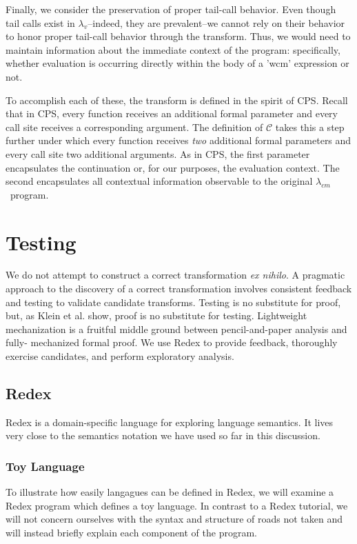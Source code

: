 \documentclass[ms,electronic,twosidetoc,letterpaper,chaptercenter,parttop]{byumsphd}
\newcommand{\lv}{$\lambda_v$}
\newcommand{\cm}{$\lambda_{cm}$}
\begin{document}
Finally, we consider the preservation of proper tail-call behavior. Even though tail calls exist in \lv--indeed, they are prevalent--we cannot rely on their behavior to honor proper tail-call behavior through the transform. Thus, we would need to maintain information about the immediate context of the program: specifically, whether evaluation is occurring directly within the body of a \scheme'wcm' expression or not.

To accomplish each of these, the transform is defined in the spirit of CPS. Recall that in
CPS, every function receives an additional formal parameter and every call site receives a
corresponding argument. The definition of $\mathcal{C}$ takes this a step further under
which every function receives \emph{two} additional formal parameters and every call site
two additional arguments. As in CPS, the first parameter encapsulates the continuation or,
for our purposes, the evaluation context. The second encapsulates all contextual
information observable to the original \cm\ program.

\chapter{Testing}

We do not attempt to construct a correct transformation \emph{ex nihilo}. A pragmatic
approach to the discovery of a correct transformation involves consistent feedback and
testing to validate candidate transforms. Testing is no substitute for proof, but, as
Klein et al. \cite{klein2012run} show, proof is no substitute for testing. Lightweight
mechanization is a fruitful middle ground between pencil-and-paper analysis and fully-
mechanized formal proof. We use Redex to provide feedback, thoroughly exercise candidates,
and perform exploratory analysis.

\section{Redex}

Redex \cite{findler2010redex} is a domain-specific language for exploring language
semantics. It lives very close to the semantics notation we have used so far in this
discussion.

\subsection{Toy Language}
To illustrate how easily langagues can be defined in Redex, we will examine a Redex
program which defines a toy language. In contrast to a Redex tutorial, we will not concern
ourselves with the syntax and structure of roads not taken and will instead briefly
explain each component of the program.
\end{document}
